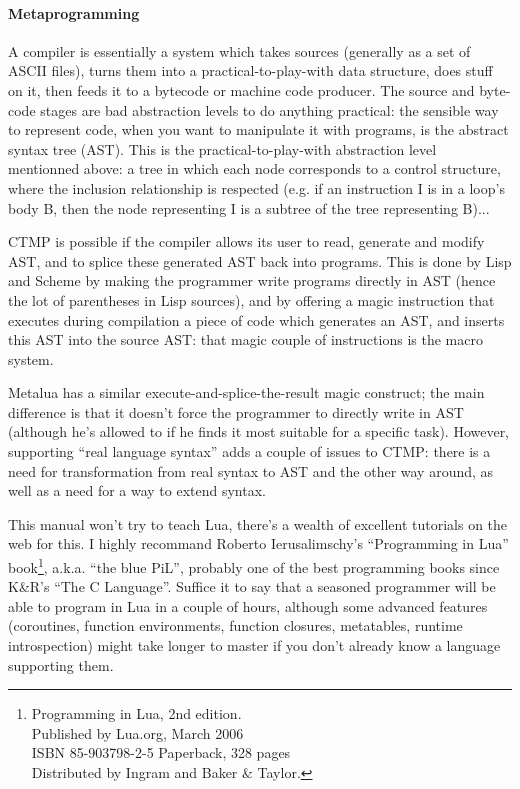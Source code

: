 \paragraph{Metaprogramming}
A compiler is essentially a system which takes sources (generally as
a set of ASCII files), turns them into a practical-to-play-with data
structure, does stuff on it, then feeds it to a bytecode or machine
code producer. The source and byte-code stages are bad abstraction
levels to do anything practical: the sensible way to represent code,
when you want to manipulate it with programs, is the abstract syntax
tree (AST). This is the practical-to-play-with abstraction level
mentionned above: a tree in which each node corresponds to a control
structure, where the inclusion relationship is respected (e.g. if an
instruction I is in a loop's body B, then the node representing I
is a subtree of the tree representing B)...

CTMP is possible if the compiler allows its user to read, generate and
modify AST, and to splice these generated AST back into programs. This
is done by Lisp and Scheme by making the programmer write programs
directly in AST (hence the lot of parentheses in Lisp sources), and by
offering a magic instruction that executes during compilation a piece
of code which generates an AST, and inserts this AST into the source
AST: that magic couple of instructions is the macro system.

Metalua has a similar execute-and-splice-the-result magic construct;
the main difference is that it doesn't force the programmer to
directly write in AST (although he's allowed to if he finds it most
suitable for a specific task). However, supporting ``real language
syntax'' adds a couple of issues to CTMP: there is a need for
transformation from real syntax to AST and the other way around, as
well as a need for a way to extend syntax.

This manual won't try to teach Lua, there's a wealth of excellent
tutorials on the web for this. I highly recommand Roberto
Ierusalimschy's ``Programming in Lua''
book\footnote{Programming in Lua, 2nd edition.\\
  Published by Lua.org, March 2006\\
  ISBN 85-903798-2-5 Paperback, 328 pages\\
  Distributed by Ingram and Baker \& Taylor.}, 
a.k.a. ``the blue PiL'', probably one of the best programming books
since K\&R's ``The C Language''. Suffice it to say that a seasoned
programmer will be able to program in Lua in a couple of hours,
although some advanced features (coroutines, function environments,
function closures, metatables, runtime introspection) might take
longer to master if you don't already know a language supporting them.

